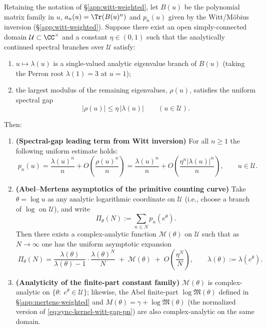 \begin{proposition}\label{prop:sync-kernel-abel-mertens-analytic-family}
Retaining the notation of \S\ref{app:witt-weighted}, let \(B(u)\) be the polynomial matrix family in \(u\),
\(
a_n(u)=\Tr(B(u)^n)
\)
and \(p_n(u)\) given by the Witt/M\"obius inversion (\S\ref{app:witt-weighted}).
Suppose there exist an open simply-connected domain \(\mathcal U\subset\CC^\times\) and a constant \(\eta\in(0,1)\) such that the analytically continued spectral branches over \(\mathcal U\) satisfy:
\begin{enumerate}
  \item \(u\mapsto \lambda(u)\) is a single-valued analytic eigenvalue branch of \(B(u)\) (taking the Perron root \(\lambda(1)=3\) at \(u=1\));
  \item the largest modulus of the remaining eigenvalues, \(\rho(u)\), satisfies the uniform spectral gap
  \[
  \boxed{\ |\rho(u)|\le \eta\,|\lambda(u)|\qquad(u\in\mathcal U).\ }
  \]
\end{enumerate}
Then:
\begin{enumerate}
  \item \textbf{(Spectral-gap leading term from Witt inversion)} For all \(n\ge 1\) the following uniform estimate holds:
  \begin{equation}\label{eq:sync-kernel-witt-gap-pn}
  \boxed{\;
  p_n(u)=\frac{\lambda(u)^n}{n}+O\!\left(\frac{\rho(u)^n}{n}\right)
  =\frac{\lambda(u)^n}{n}+O\!\left(\frac{\eta^n|\lambda(u)|^n}{n}\right),\qquad u\in\mathcal U.\;}
  \end{equation}
  \item \textbf{(Abel--Mertens asymptotics of the primitive counting curve)}
  Take \(\theta=\log u\) as any analytic logarithmic coordinate on \(\mathcal U\) (i.e., choose a branch of \(\log\) on \(\mathcal U\)), and write
  \[
  \Pi_\theta(N):=\sum_{n\le N}p_n(e^\theta).
  \]
  Then there exists a complex-analytic function \(\mathcal M(\theta)\) on \(\mathcal U\) such that as \(N\to\infty\) one has the uniform asymptotic expansion
  \begin{equation}\label{eq:sync-kernel-abel-mertens-Pi}
  \boxed{\;
  \Pi_\theta(N)
  =\frac{\lambda(\theta)}{\lambda(\theta)-1}\cdot\frac{\lambda(\theta)^N}{N}\;+\;\mathcal M(\theta)\;+\;O\!\left(\frac{\eta^N}{N}\right),\qquad
  \lambda(\theta):=\lambda(e^\theta).\;}
  \end{equation}
  \item \textbf{(Analyticity of the finite-part constant family)}
  \(\mathcal M(\theta)\) is complex-analytic on \(\{\theta:\ e^\theta\in\mathcal U\}\);
  likewise, the Abel finite-part \(\log\mathfrak{M}(\theta)\) defined in \S\ref{app:mertens-weighted} and \(M(\theta)=\gamma+\log\mathfrak{M}(\theta)\) (the normalized version of \eqref{eq:sync-kernel-witt-gap-pn}) are also complex-analytic on the same domain.
\end{enumerate}
\end{proposition}

